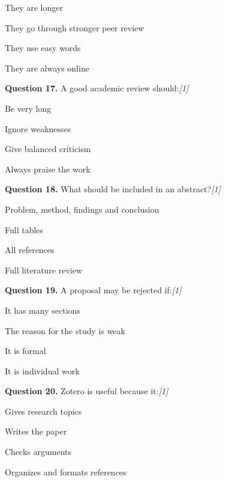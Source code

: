 \documentclass[11pt,a4paper]{article}
\newcommand{\pts}[1]{\hfill   \textit{[#1]}}
\begin{document}
\begin{parts}
  \item They are longer
  \item They go through stronger peer review
  \item They use easy words
  \item They are always online
\end{parts}

\medskip




\noindent   \textbf{Question 17.} A good academic review should:\pts{1}

\begin{parts}
  \item Be very long
  \item Ignore weaknesses
  \item Give balanced criticism
  \item Always praise the work
\end{parts}

\medskip




\noindent   \textbf{Question 18.} What should be included in an abstract?\pts{1}

\begin{parts}
  \item Problem, method, findings and conclusion
  \item Full tables
  \item All references
  \item Full literature review
\end{parts}

\medskip




\noindent   \textbf{Question 19.} A proposal may be rejected if:\pts{1}

\begin{parts}
  \item It has many sections
  \item The reason for the study is weak
  \item It is formal
  \item It is individual work
\end{parts}

\medskip




\noindent   \textbf{Question 20.} Zotero is useful because it:\pts{1}

\begin{parts}
  \item Gives research topics
  \item Writes the paper
  \item Checks arguments
  \item Organizes and formats references
\end{parts}
\end{document}

